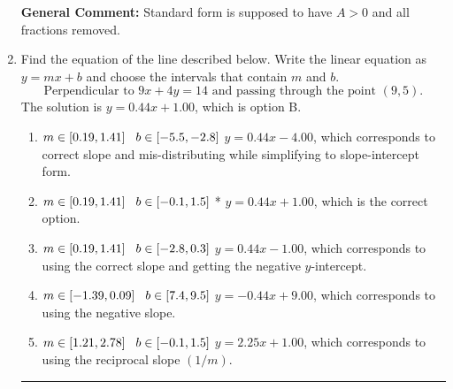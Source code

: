 \documentclass{extbook}[14pt]
\newcommand{\litem}[1]{\item #1

\rule{\textwidth}{0.4pt}}
\begin{document}
\begin{enumerate}
{\textbf{General Comment:} Standard form is supposed to have $A > 0$ and all fractions removed.
}
\litem{
Find the equation of the line described below. Write the linear equation as $ y=mx+b $ and choose the intervals that contain $m$ and $b$.
\[ \text{Perpendicular to } 9 x + 4 y = 14 \text{ and passing through the point } (9, 5). \]
The solution is \( y = 0.44x + 1.00 \), which is option B.\begin{enumerate}[label=\Alph*.]
\item \( m \in [0.19, 1.41] \hspace*{3mm} b \in [-5.5, -2.8] \)
 $y = 0.44x - 4.00$, which corresponds to correct slope and mis-distributing while simplifying to slope-intercept form.
\item \( m \in [0.19, 1.41] \hspace*{3mm} b \in [-0.1, 1.5] \)
* $y = 0.44x + 1.00$, which is the correct option.
\item \( m \in [0.19, 1.41] \hspace*{3mm} b \in [-2.8, 0.3] \)
 $y = 0.44x - 1.00$, which corresponds to using the correct slope and getting the negative $y$-intercept.
\item \( m \in [-1.39, 0.09] \hspace*{3mm} b \in [7.4, 9.5] \)
 $y = -0.44x + 9.00$, which corresponds to using the negative slope.
\item \( m \in [1.21, 2.78] \hspace*{3mm} b \in [-0.1, 1.5] \)
 $y = 2.25x + 1.00$, which corresponds to using the reciprocal slope $(1/m)$.
\end{enumerate}

}
\end{enumerate}
\end{document}
